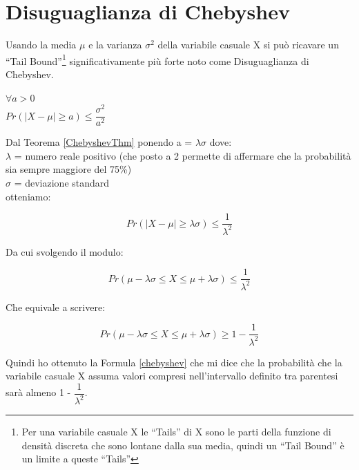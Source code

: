 \section{Disuguaglianza di Chebyshev}\label{disuguaglianzaChebyshev}
Usando la media $\mu$ e la varianza $\sigma^{2}$ della variabile casuale X si pu\`o ricavare un ``Tail Bound''\footnote{Per una variabile casuale X le ``Tails'' di X sono le parti della funzione di densit\`a discreta che sono lontane dalla sua media, quindi un ``Tail Bound'' \`e un limite a queste ``Tails''} significativamente pi\`u forte noto come Disuguaglianza di Chebyshev.

\begin{theorem}
\label{ChebyshevThm}
    $\forall a > 0$\\
    $Pr(\mid X - \mu \mid \ge a) \le \dfrac{\sigma^{2}}{a^{2}}$ 
\end{theorem}

Dal Teorema \ref{ChebyshevThm} ponendo a = $\lambda\sigma$ dove:\\
$\lambda$ = numero reale positivo (che posto a 2 permette di affermare che la probabilit\`a sia sempre maggiore del 75\%)\\
$\sigma$ = deviazione standard\\
otteniamo:

\begin{equation}
    Pr(\mid X - \mu \mid \ge \lambda\sigma) \le \dfrac{1}{\lambda^{2}}
\end{equation}

Da cui svolgendo il modulo:

\begin{equation}
    Pr(\mu - \lambda\sigma \le X \le \mu + \lambda\sigma) \le \dfrac{1}{\lambda^{2}}
\end{equation}

Che equivale a scrivere:

\begin{equation}\label{chebyshev}
    Pr(\mu - \lambda\sigma \le X \le \mu + \lambda\sigma) \ge 1 - \dfrac{1}{\lambda^{2}}
\end{equation}

Quindi ho ottenuto la Formula \ref{chebyshev} che mi dice che la probabilit\`a che la variabile casuale X assuma valori compresi nell'intervallo definito tra parentesi sar\`a almeno 1 - $\dfrac{1}{\lambda^{2}}$. \cite{probAndComputing}